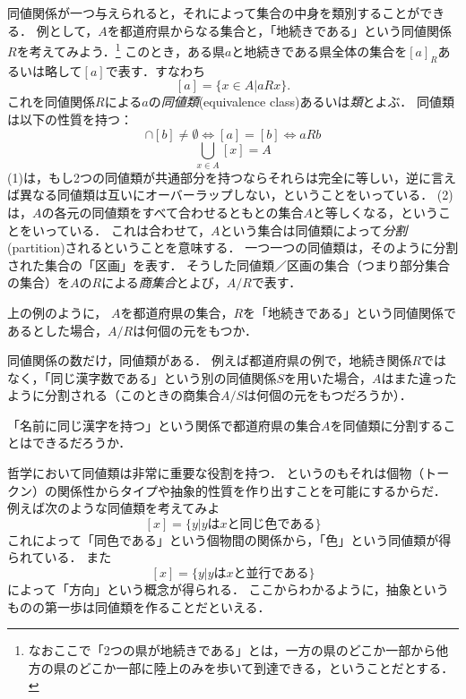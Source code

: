 \documentclass[dvipdfmx, 11pt,a4paper]{jsarticle}
\begin{document}
同値関係が一つ与えられると，それによって集合の中身を類別することができる．
例として，$A$を都道府県からなる集合と，「地続きである」という同値関係$R$を考えてみよう．\footnote{なおここで「2つの県が地続きである」とは，一方の県のどこか一部から他方の県のどこか一部に陸上のみを歩いて到達できる，ということだとする．}
このとき，ある県$a$と地続きである県全体の集合を$[a]_R$あるいは略して$[a]$で表す．すなわち
\[
 [a] = \{x \in A | aRx\}.
\]
これを同値関係$R$による$a$の\emph{同値類}(equivalence class)あるいは\emph{類}とよぶ．
同値類は以下の性質を持つ：
\begin{equation}
[a] \cap [b] \neq \emptyset  \iff [a] = [b] \iff aRb
\end{equation}
\begin{equation}
\bigcup_{x \in A} [x] = A
\end{equation}
(1)は，もし2つの同値類が共通部分を持つならそれらは完全に等しい，逆に言えば異なる同値類は互いにオーバーラップしない，ということをいっている．
(2)は，$A$の各元の同値類をすべて合わせるともとの集合$A$と等しくなる，ということをいっている．
これは合わせて，$A$という集合は同値類によって\emph{分割}(partition)されるということを意味する．
一つ一つの同値類は，そのように分割された集合の「区画」を表す．
そうした同値類／区画の集合（つまり部分集合の集合）を$A$の$R$による\emph{商集合}とよび，$A/R$で表す．

\begin{renshu}{}{}
上の例のように， $A$を都道府県の集合，$R$を「地続きである」という同値関係であるとした場合，$A/R$は何個の元をもつか．
\end{renshu}

同値関係の数だけ，同値類がある．
例えば都道府県の例で，地続き関係$R$ではなく，「同じ漢字数である」という別の同値関係$S$を用いた場合，$A$はまた違ったように分割される（このときの商集合$A/S$は何個の元をもつだろうか）．

\begin{renshu}{}{}
「名前に同じ漢字を持つ」という関係で都道府県の集合$A$を同値類に分割することはできるだろうか．
\end{renshu}

哲学において同値類は非常に重要な役割を持つ．
というのもそれは個物（トークン）の関係性からタイプや抽象的性質を作り出すことを可能にするからだ．
例えば次のような同値類を考えてみよ
\[
 [x] = \{ y | y \text{は} x \text{と同じ色である}\}
\]
これによって「同色である」という個物間の関係から，「色」という同値類が得られている．
また
\[
 [x] = \{ y | y \text{は} x \text{と並行である}\}
\]
によって「方向」という概念が得られる．
ここからわかるように，抽象というものの第一歩は同値類を作ることだといえる．
\end{document}

